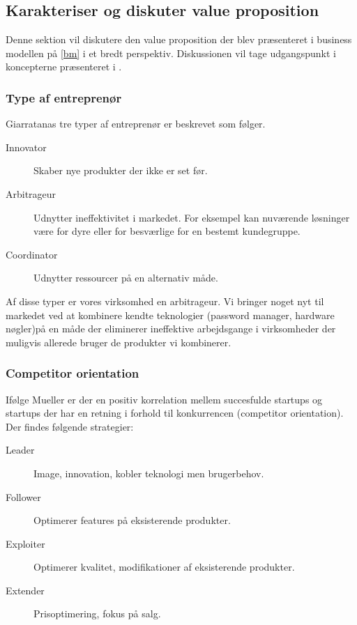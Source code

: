 \subsection{Karakteriser og diskuter value proposition}

Denne sektion vil diskutere den value proposition der blev præsenteret i business modellen på \cref{bm} i et bredt perspektiv.
Diskussionen vil tage udgangspunkt i koncepterne præsenteret i \citet[p.~40]{rose2012software}.

\subsubsection{Type af entreprenør}
Giarratanas tre typer af entreprenør er beskrevet som følger.

\begin{description}
	\item[Innovator] Skaber nye produkter der ikke er set før.
	\item [Arbitrageur] Udnytter ineffektivitet i markedet. For eksempel kan nuværende løsninger være for dyre eller for besværlige for en bestemt kundegruppe.
	\item [Coordinator] Udnytter ressourcer på en alternativ måde.
\end{description}

Af disse typer er vores virksomhed en arbitrageur.
Vi bringer noget nyt til markedet ved at kombinere kendte teknologier (password manager, hardware nøgler)på en måde der eliminerer ineffektive arbejdsgange i virksomheder der muligvis allerede bruger de produkter vi kombinerer.

\subsubsection{Competitor orientation}
Ifølge Mueller \citep[p.~40]{rose2012software} er der en positiv korrelation mellem succesfulde startups og startups der har en retning i forhold til konkurrencen (competitor orientation).
Der findes følgende strategier:
\begin{description}
	\item[Leader] Image, innovation, kobler teknologi men brugerbehov.
	\item[Follower] Optimerer features på eksisterende produkter.
	\item [Exploiter] Optimerer kvalitet, modifikationer af eksisterende produkter.
	\item [Extender] Prisoptimering, fokus på salg.
\end{description}

